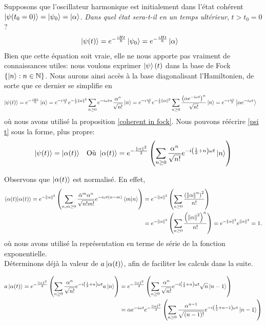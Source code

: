 \documentclass[11pt,oneside,a4paper]{article}
\newcommand{\h}{\ensuremath{\hbar}}
\begin{document}
Supposons que l'oscillateur harmonique est initialement dans l'état cohérent $\ket{\psi (t_0 = 0)} = \ket{\psi_0} = \ket{\alpha}$. \emph{Dans quel état sera-t-il en un temps ultérieur}, $t>t_0 = 0$ ?
\begin{align}
  \ket{\psi(t)} &= e^{-\frac{iHt}{\h}}\ket{\psi_0} = e^{-\frac{iHt}{\h}}\ket{\alpha}  
\end{align}
Bien que cette équation soit vraie, elle ne nous apporte pas vraiment de connaissances utiles: nous voulons exprimer $\ket{\psi} (t)$ dans la base de Fock $\left\{\ket{n} : n\in\mathbb{N}\right\}$. Nous aurons ainsi accès à la base diagonalisant l'Hamiltonien, de sorte que ce dernier se simplifie en
\begin{align}
  \ket{\psi(t)} = e^{-\frac{iHt}{\h}}\ket{\alpha} &= e^{-i\frac{\omega t}{2}}e^{-\frac{1}{2}\norm{\alpha}^2}\sum_{n\geq 0}e^{-i\omega tn}\frac{\alpha^n}{\sqrt{n!}}\ket{n}
  = e^{-i\frac{\omega t}{2}}e^{-\frac{1}{2}\norm{\alpha}^2}\sum_{n\geq 0}\frac{\left(\alpha e^{-i\omega t}\right)^n}{\sqrt{n!}}\ket{n}
  = e^{-i\frac{\omega t}{2}}\ket{\alpha e^{-i\omega t}}\label{psi t}
\end{align}
où nous avons utilisé la proposition \eqref{coherent in fock}. Nous pouvons réécrire \eqref{psi t} sous la forme, plus propre:
\begin{align}
  \ket{\psi(t)} &= \ket{\alpha(t)} &\text{Où }\ket{\alpha(t)} = e^{-\frac{\norm{\alpha}^2}{2}}\left(\sum_{n\geq 0}\frac{\alpha^n}{\sqrt{n!}}e^{-i\left(\frac{1}{2}+n    \right)\omega t}\ket{n}\right) 
\end{align}

Observons que $\ket{\alpha(t)}$ est normalisé. En effet,
\begin{align}
  \braket{\alpha(t)} = e^{-\norm{\alpha}^2}\left(\sum_{n,m\geq 0}\frac{\bar{\alpha}^m\alpha^n}{\sqrt{n!m!}}e^{-i\omega t\left(n-m\right)}\braket{m}{n}\right)
  &= e^{-\norm{\alpha}^2}\left(\sum_{n\geq 0}\frac{\left(\norm{\alpha}^n\right)^2}{n!}\right)\\
  &= e^{-\norm{\alpha}^2}\left(\sum_{n\geq 0}\frac{\left(\norm{\alpha}^2\right)^n}{n!}\right) = e^{-\norm{\alpha}^2}e^{\norm{\alpha}^2} = 1.
\end{align}
où nous avons utilisé la représentation en terme de série de la fonction exponentielle.\\

Déterminons déjà la valeur de $a\ket{\alpha(t)}$, afin de faciliter les calculs dans la suite. 

\begin{align}
  a\ket{\alpha(t)} = e^{-\frac{\norm{\alpha}^2}{2}}\left(\sum_{n\geq 0}\frac{\alpha^n}{\sqrt{n!}}e^{-i\left(\frac{1}{2}+n\right)\omega t}a\ket{n}\right)
  &= e^{-\frac{\norm{\alpha}^2}{2}}\left(\sum_{n\geq 0}\frac{\alpha^n}{\sqrt{n!}}e^{-i\left(\frac{1}{2}+n    \right)\omega t}\sqrt{n}\ket{n-1}\right)\\
  &= \alpha e^{-i\omega t}e^{-\frac{\norm{\alpha}^2}{2}}\left(\sum_{n\geq 0}\frac{\alpha^{n-1}}{\sqrt{(n-1)!}}e^{-i\left(\frac{1}{2}+n-1    \right)\omega t}\ket{n-1}\right)
\end{align}
\end{document}
